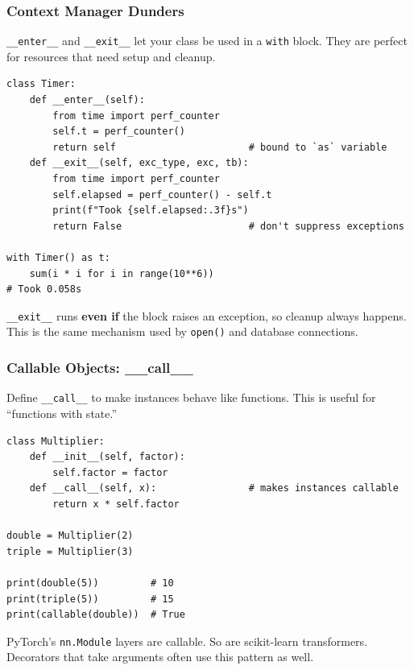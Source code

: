 \documentclass[aspectratio=169,10pt]{beamer}
\newcommand{\keyword}[1]{\textcolor{PrimaryBlue}{\textbf{#1}}}
\newcommand{\codeword}[1]{\texttt{#1}}
\newenvironment{bluebox}[1]{%
  \vspace{0.08cm}\begin{tcolorbox}[lecturebox,title={#1},fontupper=\small]%
}{\end{tcolorbox}\vspace{0.05cm}}
\begin{document}
\begin{frame}[fragile]
\frametitle{Context Manager Dunders}
\small
\codeword{\_\_enter\_\_} and \codeword{\_\_exit\_\_} let your class be used in a \codeword{with} block. They are perfect for resources that need setup and cleanup.

\vspace{0.12cm}
\begin{lstlisting}[style=pycode]
class Timer:
    def __enter__(self):
        from time import perf_counter
        self.t = perf_counter()
        return self                       # bound to `as` variable
    def __exit__(self, exc_type, exc, tb):
        from time import perf_counter
        self.elapsed = perf_counter() - self.t
        print(f"Took {self.elapsed:.3f}s")
        return False                      # don't suppress exceptions

with Timer() as t:
    sum(i * i for i in range(10**6))
# Took 0.058s
\end{lstlisting}

\begin{tcolorbox}[lecturebox,title=Why this matters]
\codeword{\_\_exit\_\_} runs \keyword{even if} the block raises an exception, so cleanup always happens. This is the same mechanism used by \codeword{open()} and database connections.
\end{tcolorbox}
\end{frame}


\begin{frame}[fragile]
\frametitle{Callable Objects: \_\_call\_\_}
\small
Define \codeword{\_\_call\_\_} to make instances behave like functions. This is useful for ``functions with state.''

\vspace{0.15cm}
\begin{lstlisting}[style=pycode]
class Multiplier:
    def __init__(self, factor):
        self.factor = factor
    def __call__(self, x):                # makes instances callable
        return x * self.factor

double = Multiplier(2)
triple = Multiplier(3)

print(double(5))         # 10
print(triple(5))         # 15
print(callable(double))  # True
\end{lstlisting}

\begin{bluebox}{Where you have seen this}
PyTorch's \codeword{nn.Module} layers are callable. So are scikit-learn transformers. Decorators that take arguments often use this pattern as well.
\end{bluebox}
\end{frame}
\end{document}
